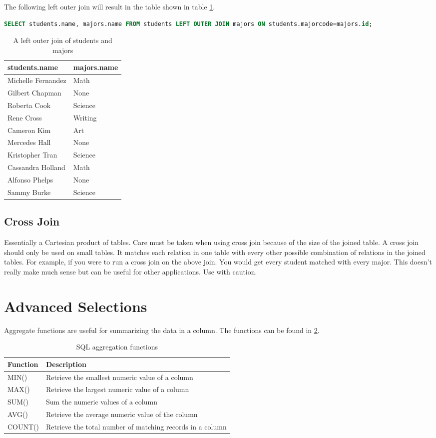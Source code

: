 The following left outer join will result in the table shown in table \ref{table:lo_studentsmajors}.
\begin{lstlisting}[language=SQL]
SELECT students.name, majors.name FROM students LEFT OUTER JOIN majors ON students.majorcode=majors.id;
\end{lstlisting}
\begin{table}
\begin{tabular}{|l|l|}
\hline
students.name & majors.name \\
\hline
Michelle Fernandez & Math \\
Gilbert Chapman & None \\
Roberta Cook & Science \\
Rene Cross & Writing \\
Cameron Kim & Art \\
Mercedes Hall & None \\
Kristopher Tran & Science \\
Cassandra Holland & Math \\
Alfonso Phelps & None \\
Sammy Burke & Science \\
\hline
\end{tabular}
\caption{A left outer join of students and majors}
\label{table:lo_studentsmajors}
\end{table}

\subsection*{Cross Join}
Essentially a Cartesian product of tables.  
Care must be taken when using cross join because of the size of the joined table.
A cross join should only be used on small tables.
It matches each relation in one table with every other possible combination of relations in the joined tables.
For example, if you were to run a cross join on the above join.  You would get every student matched with every major.
This doesn't really make much sense but can be useful for other applications.
Use with caution.

\section*{Advanced Selections}
Aggregate functions are useful for summarizing the data in a column.
The functions can be found in \ref{table:aggregations}.
\begin{table}
\begin{tabular}{|l|l|}
\hline
Function & Description \\
\hline
MIN() & Retrieve the smallest numeric value of a column \\
MAX()& Retrieve the largest numeric value of a column \\
SUM() & Sum the numeric values of a column \\
AVG() & Retrieve the average numeric value of the column \\
COUNT() & Retrieve the total number of matching records in a column \\
\hline
\end{tabular}
\caption{SQL aggregation functions}
\label{table:aggregations}
\end{table}


